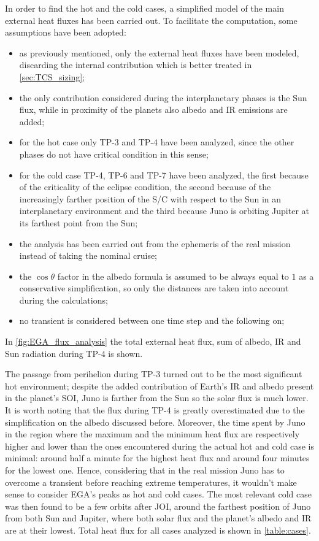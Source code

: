 In order to find the hot and the cold cases, a simplified model of the main external heat fluxes has been carried out. To facilitate the computation, some assumptions have been adopted:
\begin{itemize}
    \item as previously mentioned, only the external heat fluxes have been modeled, discarding the internal contribution which is better treated in \autoref{sec:TCS_sizing}; \\
    \item the only contribution considered during the interplanetary phases is the Sun flux, while in proximity of the planets also albedo and IR emissions are added;
    \item for the hot case only TP-3 and TP-4 have been analyzed, since the other phases do not have critical condition in this sense;
    \item for the cold case TP-4, TP-6 and TP-7 have been analyzed, the first because of the criticality of the eclipse condition, the second because of the increasingly farther position of the S/C with respect to the Sun in an interplanetary environment and the third because Juno is orbiting Jupiter at its farthest point from the Sun;
    \item the analysis has been carried out from the ephemeris of the real mission instead of taking the nominal cruise;
    \item the $\cos \theta$ factor in the albedo formula is assumed to be always equal to $1$ as a conservative simplification, so only the distances are taken into account during the calculations;
    \item no transient is considered between one time step and the following on; %
\end{itemize}

In \autoref{fig:EGA_flux_analysis} the total external heat flux, sum of albedo, IR and Sun radiation during TP-4 is shown. 


The passage from perihelion during TP-3 turned out to be the most significant hot environment; despite the added contribution of Earth’s IR and albedo present in the planet’s SOI, Juno is farther from the Sun so the solar flux is much lower. It is worth noting that the flux during TP-4 is greatly overestimated due to the simplification on the albedo discussed before. Moreover, the time spent by Juno in the region where the maximum and the minimum heat flux are respectively higher and lower than the ones encountered during the actual hot and cold case is minimal: around half a minute for the highest heat flux and around four minutes for the lowest one. Hence, considering that in the real mission Juno has to overcome a transient before reaching extreme temperatures, it wouldn't make sense to consider EGA's peaks as hot and cold cases. The most relevant cold case was then found to be a few orbits after JOI, around the farthest position of Juno from both Sun and Jupiter, where both solar flux and the planet's albedo and IR are at their lowest. 
Total heat flux for all cases analyzed is shown in \autoref{table:cases}.

